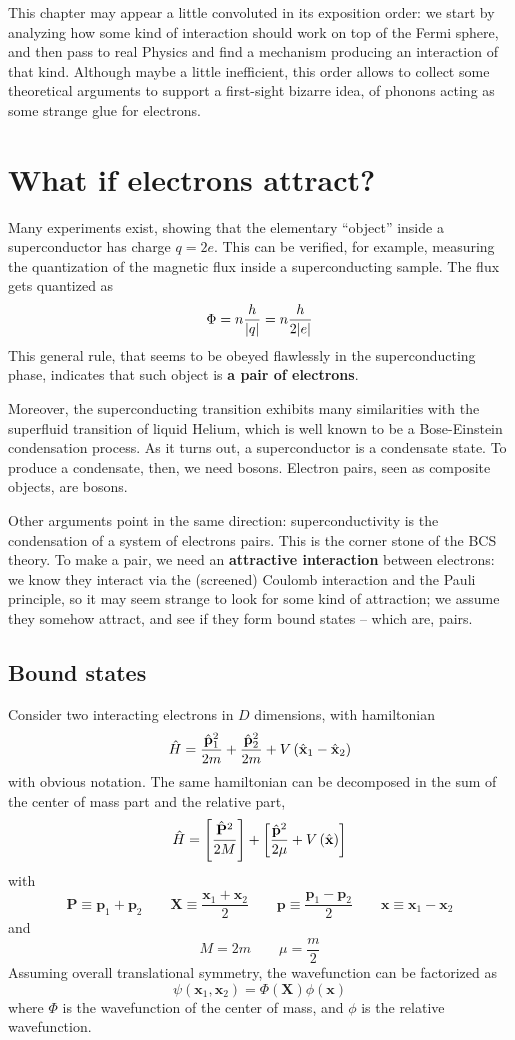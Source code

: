 This chapter may appear a little convoluted in its exposition order: we start by analyzing how some kind of interaction should work on top of the Fermi sphere, and then pass to real Physics and find a mechanism producing an interaction of that kind. Although maybe a little inefficient, this order allows to collect some theoretical arguments to support a first-sight bizarre idea, of phonons acting as some strange glue for electrons.

\section{What if electrons attract?}

Many experiments exist, showing that the elementary ``object'' inside a superconductor has charge $q=2e$. This can be verified, for example, measuring the quantization of the magnetic flux inside a superconducting sample. The flux gets quantized as
\[
	\Phi = n\frac{h}{\abs{q}} = n \frac{h}{2\abs{e}} 
\]
This general rule, that seems to be obeyed flawlessly in the superconducting phase, indicates that such object is \textbf{a pair of electrons}.

Moreover, the superconducting transition exhibits many similarities with the superfluid transition of liquid Helium, which is well known to be a Bose-Einstein condensation process. As it turns out, a superconductor is a condensate state. To produce a condensate, then, we need bosons. Electron pairs, seen as composite objects, are bosons.

Other arguments point in the same direction: superconductivity is the condensation of a system of electrons pairs. This is the corner stone of the BCS theory. To make a pair, we need an \textbf{attractive interaction} between electrons: we know they interact via the (screened) Coulomb interaction and the Pauli principle, so it may seem strange to look for some kind of attraction; we assume they somehow attract, and see if they form bound states -- which are, pairs.

\subsection{Bound states}\label{subsec:bound states}

Consider two interacting electrons in $D$ dimensions, with hamiltonian
\[
	\hat H = \frac{\hat{\mathbf{p}}_1^2}{2m} + \frac{\hat{\mathbf{p}}_2^2}{2m} + V\left({\hat{\mathbf{x}}_1-\hat{\mathbf{x}}_2}\right)
\]
with obvious notation. The same hamiltonian can be decomposed in the sum of the center of mass part and the relative part,
\[
	\hat H = \left[{\frac{\hat{\mathbf{P}}^2}{2M}}\right] + \left[{\frac{\hat{\mathbf{p}}^2}{2\mu} + V \left({\hat{\mathbf{x}}}\right)}\right]
\]
with
\[
	\mathbf{P} \equiv \mathbf{p}_1 + \mathbf{p}_2
	\qquad
	\mathbf{X} \equiv \frac{\mathbf{x}_1 + \mathbf{x}_2}{2}
	\qquad
	\mathbf{p} \equiv \frac{\mathbf{p}_1 - \mathbf{p}_2}{2}
	\qquad
	\mathbf{x} \equiv \mathbf{x}_1 - \mathbf{x}_2
\]
and
\[
	M = 2m
	\qquad
	\mu = \frac{m}{2}
\]
Assuming overall translational symmetry, the wavefunction can be factorized as
\[
	\psi(\mathbf{x}_1,\mathbf{x}_2) = \Phi(\mathbf{X}) \phi(\mathbf{x})
\]
where $\Phi$ is the wavefunction of the center of mass, and $\phi$ is the relative wavefunction.

